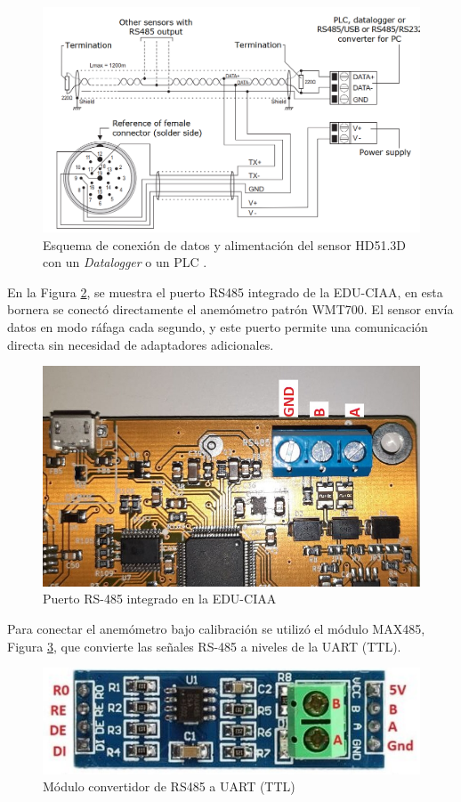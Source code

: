 \begin{figure}[H]
    \centering
    \includegraphics[width=0.8\linewidth]{Figuras/datalogger/Hardware/rs485DeltaOhm.png}
    \caption{Esquema de conexión de datos y alimentación del sensor HD51.3D con un \textit{Datalogger} o un PLC \cite{DeltaOHM_HD51.3D_manual}.}
    \label{fig:rs485DeltaOhm}
\end{figure}
En la Figura \ref{fig:rs485CIAA}, se muestra el puerto RS485 integrado de la EDU-CIAA, en esta bornera se conectó directamente el anemómetro patrón WMT700. El sensor envía datos en modo ráfaga cada segundo, y este puerto permite una comunicación directa sin necesidad de adaptadores adicionales.
\begin{figure}[H]
    \centering
    \includegraphics[width=0.45\linewidth]{Figuras/datalogger/Hardware/rs485CIAA.jpg}
    \caption{Puerto RS-485 integrado en la EDU-CIAA}
    \label{fig:rs485CIAA}
\end{figure}

Para conectar el anemómetro bajo calibración se utilizó el módulo MAX485, Figura \ref{fig:moduleMax485}, que convierte las señales RS-485 a niveles de la UART (TTL). 
\begin{figure}[H]
    \centering
    \includegraphics[width=0.5\linewidth]{Figuras/datalogger/Hardware/moduleMax485.png}
    \caption{Módulo convertidor de RS485 a UART (TTL)}
    \label{fig:moduleMax485}
\end{figure}


